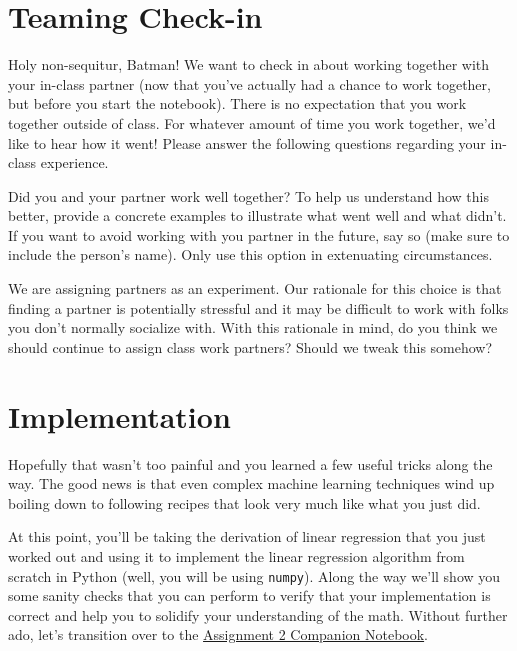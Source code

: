 \documentclass[assignment02_Solutions]{subfiles}
\begin{document}
\section*{Teaming Check-in}

\begin{exercise}
Holy non-sequitur, Batman! We want to check in about working together with your in-class partner (now that you've actually had a chance to work together, but before you start the notebook). There is no expectation that you work together outside of class. For whatever amount of time you work together, we'd like to hear how it went!  Please answer the following questions regarding your in-class experience.

\bes
\item Did you and your partner work well together?  To help us understand how this better, provide a concrete examples to illustrate what went well and what didn't.  If you want to avoid working with you partner in the future, say so (make sure to include the person's name).  Only use this option in extenuating circumstances.
\item We are assigning partners as an experiment.  Our rationale for this choice is that finding a partner is potentially stressful and it may be difficult to work with folks you don't normally socialize with.  With this rationale in mind, do you think we should continue to assign class work partners?  Should we tweak this somehow?
\ees

\end{exercise}

\section{Implementation}

Hopefully that wasn't too painful and you learned a few useful tricks along the way.  The good news is that even complex machine learning techniques wind up boiling down to following recipes that look very much like what you just did.

At this point, you'll be taking the derivation of linear regression that you just worked out and using it to implement the linear regression algorithm from scratch in Python (well, you will be using {\tt numpy}).  Along the way we'll show you some sanity checks that you can perform to verify that your implementation is correct and help you to solidify your understanding of the math. Without further ado, let's transition over to the \href{https://colab.research.google.com/github/mlfa19/assignments/blob/master/Module\%201/02/Assignment_02_Companion.ipynb}{Assignment 2 Companion Notebook}.

\end{document}
